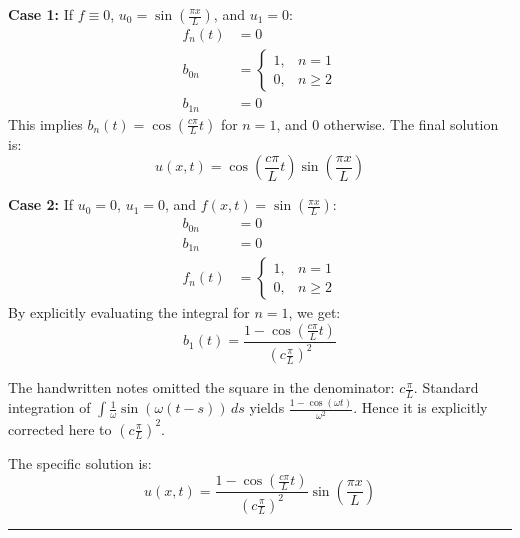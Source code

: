 \begin{example}
\textbf{Case 1:} If $f \equiv 0$, $u_0 = \sin\left(\frac{\pi x}{L}\right)$, and $u_1 = 0$:
\begin{align*}
    f_n(t) &= 0 \\
    b_{0n} &= 
    \begin{cases}
    1, & n = 1 \\
    0, & n \ge 2
    \end{cases} \\
    b_{1n} &= 0
\end{align*}
This implies $b_n(t) = \cos\left(\frac{c\pi}{L}t\right)$ for $n=1$, and $0$ otherwise. The final solution is:
\begin{equation*}
    u(x,t) = \cos\left(\frac{c\pi}{L}t\right) \sin\left(\frac{\pi x}{L}\right)
\end{equation*}

\textbf{Case 2:} If $u_0 = 0$, $u_1 = 0$, and $f(x,t) = \sin\left(\frac{\pi x}{L}\right)$:
\begin{align*}
    b_{0n} &= 0 \\
    b_{1n} &= 0 \\
    f_n(t) &= 
    \begin{cases}
    1, & n = 1 \\
    0, & n \ge 2
    \end{cases}
\end{align*}
By explicitly evaluating the integral for $n=1$, we get:
\begin{equation*}
    b_1(t) = \frac{1 - \cos\left(\frac{c\pi}{L}t\right)}{\left(c\frac{\pi}{L}\right)^2}
\end{equation*}
\begin{verification}
    The handwritten notes omitted the square in the denominator: $c\frac{\pi}{L}$. Standard integration of $\int \frac{1}{\omega} \sin(\omega(t-s)) \, ds$ yields $\frac{1-\cos(\omega t)}{\omega^2}$. Hence it is explicitly corrected here to $\left(c\frac{\pi}{L}\right)^2$.
\end{verification}
The specific solution is:
\begin{equation*}
    u(x,t) = \frac{1 - \cos\left(\frac{c\pi}{L}t\right)}{\left(c\frac{\pi}{L}\right)^2} \sin\left(\frac{\pi x}{L}\right)
\end{equation*}
\end{example}

\vspace{1em}
\hrule
\vspace{1em}

